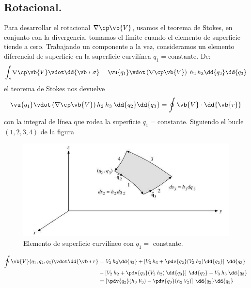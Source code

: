\subsection{Rotacional.}
Para desarrollar el rotacional $\nabla \cp \vb{V}$, usamos el teorema de Stokes, en conjunto con la divergencia, tomamos el límite cuando el elemento de superficie tiende a cero. Trabajando un componente a la vez, consideramos un elemento diferencial de superficie en la superficie curvilínea $q_{1} = \text{constante}$. De:
\begin{equation}
\int_{s} \nabla \cp \vb{V} \vdot \dd{\vb*{\sigma}} = \vu{q_{1}} \vdot \left( \nabla \cp \vb{V} \right) \; h_{2} \: h_{3} \dd{q_{2}} \dd{q_{3}}
\label{eq:ecuacion_02_23}
\end{equation}
el teorema de Stokes nos devuelve
\begin{equation}
\vu{q_{1}} \vdot \left( \nabla \cp \vb{V} \right) h_{2} \: h_{3} \: \dd{q_{2}} \dd{q_{3}} = \oint \vb{V} \cdot \dd{\vb{r}}
\label{eq:ecuacion_02_24}
\end{equation}
con la integral de línea que rodea la superficie $q_{1}=\text{constante}$. Siguiendo el bucle $(1, 2, 3, 4)$ de la figura
\begin{figure}[H]
    \centering
    \includegraphics[scale=0.5]{Imagenes/ElementoCurvilineo_02.png}
    \caption{Elemento de superficie curvilíneo con $q_{1}=$ constante. }
\end{figure}
\begin{align}
\begin{aligned}
\oint \vb{V} (q_{1}, q_{2}, q_{3}) \vdot \dd{\vb*{r}} &= V_{2} \: h_{2} \dd{q_{2}} + \left[ V_{3} \: h_{3} + \pdv{q_{2}} (V_{3} \: h_{3}) \dd{q_{2}} \right] \: \dd{q_{3}} \\
&- \left[ V_{2} \: h_{2} + \pdv{q_{3}} (V_{2} \: h_{2}) \: \dd{q_{3}} \right] \: \dd{q_{2}} - V_{3} \: h_{3} \: \dd{q_{3}} \\
&= \left[ \pdv{q_{2}} (h_{3} \: V_{3}) - \pdv{q_{3}} (h_{2} \: V_{2}) \right] \: \dd{q_{2}} \dd{q_{3}}
\end{aligned}
\label{eq:ecuacion_02_25}
\end{align}
